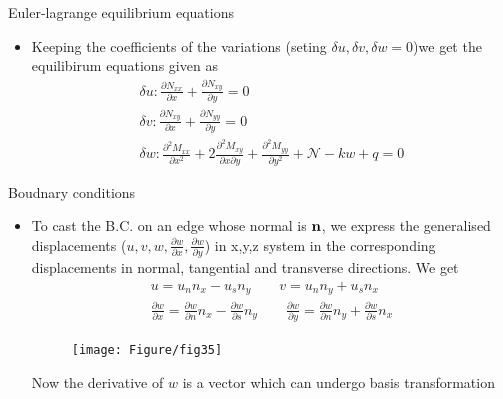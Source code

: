 	\begin{frame}{Euler-lagrange equilibrium equations}
		\begin{itemize}
			\item Keeping the coefficients of the variations (seting $\delta u, \delta v, \delta w = 0$)we get the equilibirum equations given as
			\begin{equation}
			\begin{aligned}
				\delta u : \frac{\partial N_{xx}}{\partial x} + \frac{\partial N_{xy}}{\partial y} = 0\\
				\delta v : \frac{\partial N_{xy}}{\partial x} + \frac{\partial N_{yy}}{\partial y} = 0\\
				\delta w : \frac{\partial^2 M_{xx}}{\partial x^2} + 2\frac{\partial^2 M_{xy}}{\partial x \partial y} + \frac{\partial^2 M_{yy}}{\partial y^2} + \mathcal{N} - kw + q = 0
			\end{aligned}
			\end{equation}
		\end{itemize}
	\end{frame}


	\begin{frame}{Boudnary conditions}
		\begin{itemize}
			\item To cast the B.C. on an edge whose normal is $\mathbf{n}$, we express the generalised displacements ($u,v,w,\frac{\partial w}{\partial x}, \frac{\partial w}{\partial y}$) in x,y,z system in the corresponding displacements in normal, tangential and transverse directions. We get
			\begin{equation}
			\begin{aligned}
				u = u_nn_x - u_sn_y \qquad v = u_nn_y + u_sn_x \\ 
				\frac{\partial w}{\partial x} = \frac{\partial w}{\partial n} n_x 
				- \frac{\partial w}{\partial s}n_y \qquad 
				\frac{\partial w}{\partial y} = \frac{\partial w}{\partial n}n_y
				+ \frac{\partial w}{\partial s}n_x
			\end{aligned}
			\end{equation}
			\begin{figure}
				\centering
				\texttt{[image: Figure/fig35]} 		
			\end{figure}
		Now the derivative of $w$ is a vector which can undergo basis transformation
 		\end{itemize}
	\end{frame}


